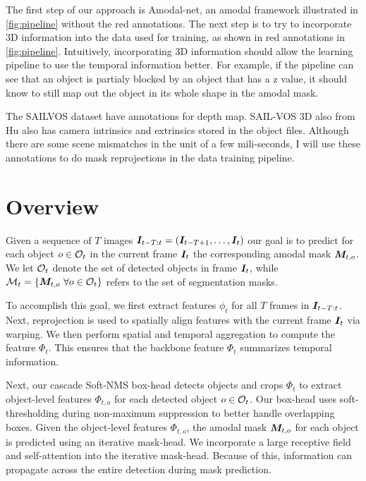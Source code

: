 The first step of our approach is Amodal-net, an amodal framework illustrated in \ref{fig:pipeline} without the red annotations. The next step is to try to incorporate 3D information into the data used for training, as shown in red annotations in \ref{fig:pipeline}. Intuitively,  incorporating 3D information should allow the learning pipeline to use the temporal information better. For example, if the pipeline can see that an object is partialy blocked by an object that has a z value, it should know to still map out the object in its whole shape in the amodal mask. 

The SAILVOS dataset\cite{hu2019sail} have annotations for depth map. SAIL-VOS 3D also from Hu \etal \cite{HuCVPR2021} also has camera intrinsics and extrinsics stored in the object files. Although there are some scene mismatches in the unit of a few mili-seconds, I will use these annotations to do mask reprojections in the data training pipeline.

\section{Overview}
Given a sequence of $T$ images ${\bm{I}}_{t-T:t}=({\bm{I}}_{t-T+1}, \hdots, {\bm{I}}_{t})$ our goal is to predict for each object $o\in{\mathcal{O}}_t$ in the current frame ${\bm{I}}_t$ the corresponding amodal mask ${\bm{M}}_{t,o}$. 
We let ${\mathcal{O}}_t$ denote the set of detected objects in frame ${\bm{I}}_t$, while ${\mathcal{M}}_t = \{{\bm{M}}_{t,o}~\forall o \in {\mathcal{O}}_t\}$ refers to the set of segmentation masks.

To accomplish this goal, we first extract features $\phi_t$ for all $T$ frames in ${\bm{I}}_{t-T:t}$. %
Next, reprojection is used to spatially align features with the current frame ${\bm{I}}_t$ via warping. We then perform spatial and temporal aggregation to compute the feature $\Phi_t$. This ensures that the backbone feature $\Phi_t$ summarizes temporal information. 

Next, our cascade Soft-NMS box-head detects objects and crops $\Phi_t$ to extract object-level features $\Phi_{t,o}$ for each detected object $o\in{\mathcal{O}}_t$. Our box-head uses soft-thresholding during non-maximum suppression to better handle overlapping boxes. Given the object-level features $\Phi_{t,o}$, the amodal mask ${\bm{M}}_{t,o}$ for each object is predicted using an iterative mask-head. We incorporate a large receptive field and self-attention into the iterative mask-head. %
Because of this, information can propagate across the entire detection during mask prediction.

